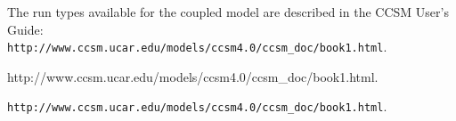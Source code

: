 
The run types available for the coupled model are described in the CCSM
User's Guide:\\

\ifpdf
                    {\tt http://www.ccsm.ucar.edu/models/ccsm4.0/ccsm\_doc/book1.html}.\\
\else
\begin{htmlonly}
                    {http://www.ccsm.ucar.edu/models/ccsm4.0/ccsm\_doc/book1.html}.
\end{htmlonly}
\begin{latexonly}
                    {\tt http://www.ccsm.ucar.edu/models/ccsm4.0/ccsm\_doc/book1.html}.
\end{latexonly}
\fi

